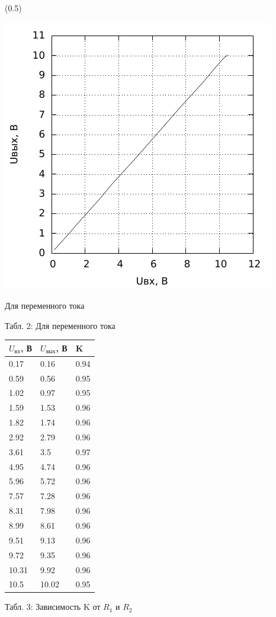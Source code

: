 \sidefig(0.5\textwidth){\includegraphics[scale=1.2]{2.pdf}
\caption{Для переменного тока}}
{Табл. 2: Для переменного тока

\begin{tabular}{|l|l|l|}
\hline
$U_{вх}$, В & $U_{вых}$, В & K \\
\hline
0.17&0.16&0.94\\
\hline
0.59&0.56&0.95\\
\hline
1.02&0.97&0.95\\
\hline
1.59&1.53&0.96\\
\hline
1.82&1.74&0.96\\
\hline
2.92&2.79&0.96\\
\hline
3.61&3.5&0.97\\
\hline
4.95&4.74&0.96\\
\hline
5.96&5.72&0.96\\
\hline
7.57&7.28&0.96\\
\hline
8.31&7.98&0.96\\
\hline
8.99&8.61&0.96\\
\hline
9.51&9.13&0.96\\
\hline
9.72&9.35&0.96\\
\hline
10.31&9.92&0.96\\
\hline
10.5&10.02&0.95\\
\hline
\end{tabular}}

Табл. 3: Зависимость K от $R_1$ и $R_2$

